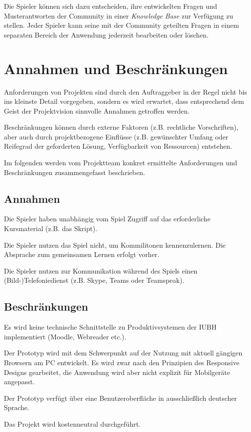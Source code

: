 \documentclass[a4paper,11pt,listof=numbered,glossary=totoc,parskip=half]{scrreprt}
\begin{document}
Die Spieler können sich dazu entscheiden, ihre entwickelten Fragen und Musterantworten der Community in einer \textit{Knowledge Base} zur Verfügung zu stellen.
Jeder Spieler kann seine mit der Community geteilten Fragen in einem separaten Bereich der Anwendung jederzeit bearbeiten oder löschen.
	\newpage
	\section{Annahmen und Beschränkungen}
	Anforderungen von Projekten sind durch den Auftraggeber in der Regel nicht bis ins kleinste Detail vorgegeben, sondern es wird erwartet, dass entsprechend dem Geist der Projektvision sinnvolle Annahmen getroffen werden. 
	
	Beschränkungen können durch externe Faktoren (z.B. rechtliche Vorschriften), aber auch durch projektbezogene Einflüsse (z.B. gewünschter Umfang oder Reifegrad der geforderten Lösung, Verfügbarkeit von Ressourcen) entstehen.	
	
	Im folgenden werden vom Projektteam konkret ermittelte Anforderungen und Beschränkungen zusammengefasst beschrieben.
	
	\subsection{Annahmen}
Die Spieler haben unabhängig vom Spiel Zugriff auf das erforderliche Kursmaterial (z.B. das Skript).

Die Spieler nutzen das Spiel nicht, um Kommilitonen kennenzulernen. Die Absprache zum gemeinsamen Lernen erfolgt vorher.

Die Spieler nutzen zur Kommunikation während des Spiels einen (Bild-)Telefoniedienst (z.B. Skype, Teams oder Teamspeak).

\subsection{Beschränkungen}
Es wird keine technische Schnittstelle zu Produktivsystemen der IUBH implementiert (Moodle, Webreader etc.).

Der Prototyp wird mit dem Schwerpunkt auf der Nutzung mit aktuell gängigen Browsern am PC entwickelt. Es wird zwar nach den Prinzipien des Responsive Designs gearbeitet, die Anwendung wird aber nicht explizit für Mobilgeräte angepasst.

Der Prototyp verfügt über eine Benutzeroberfläche in ausschließlich deutscher Sprache.

Das Projekt wird kostenneutral durchgeführt.
\end{document}
